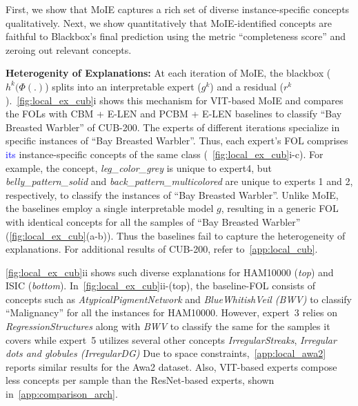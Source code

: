 
First, we show that MoIE captures a rich set of diverse instance-specific concepts qualitatively. Next, we show quantitatively that MoIE-identified concepts are faithful to Blackbox's final prediction using the metric ``completeness score'' and zeroing out relevant concepts.


\textbf{Heterogenity of Explanations:}
At each iteration of MoIE, the blackbox \big($h^k(\Phi(.)$\big) splits into an interpretable expert ($g^k$) and a residual ($r^k$).~\cref{fig:local_ex_cub}i shows this mechanism for VIT-based MoIE and compares the FOLs with CBM + E-LEN and PCBM + E-LEN baselines to classify ``Bay Breasted Warbler'' of CUB-200.
The experts of different iterations specialize in specific instances of ``Bay Breasted Warbler''. Thus, each expert's FOL comprises \textcolor{blue}{its} instance-specific concepts of the same class (~\cref{fig:local_ex_cub}i-c). For example, the concept, \emph{leg\_color\_grey} is unique to expert4, but \emph{belly\_pattern\_solid} and \emph{back\_pattern\_multicolored} are unique to experts 1 and 2, respectively, to classify the instances of ``Bay Breasted Warbler''. 
Unlike MoIE, the baselines employ a single interpretable model $g$, resulting in a generic FOL with identical concepts for all the samples of ``Bay Breasted Warbler'' (\cref{fig:local_ex_cub}(a-b)). Thus the baselines fail to capture the heterogeneity of explanations. For additional results of CUB-200, refer to~\cref{app:local_cub}.

\cref{fig:local_ex_cub}ii shows such diverse explanations for HAM10000 (\emph{top}) and ISIC (\emph{bottom}). In~\cref{fig:local_ex_cub}ii-(top), the baseline-FOL consists of concepts such as \emph{AtypicalPigmentNetwork} and \emph{BlueWhitishVeil (BWV)} to classify ``Malignancy'' for all the instances for HAM10000. However, expert~3 relies on \emph{RegressionStructures} along with \emph{BWV} to classify the same for the samples it covers while expert~5 utilizes several other concepts \eg \emph{IrregularStreaks}, \emph{Irregular dots and globules (IrregularDG)} \etc \text{ }Due to space constraints,~\cref{app:local_awa2} reports similar results for the Awa2 dataset. Also, VIT-based experts compose less concepts per sample than the ResNet-based experts, shown in~\cref{app:comparison_arch}.

